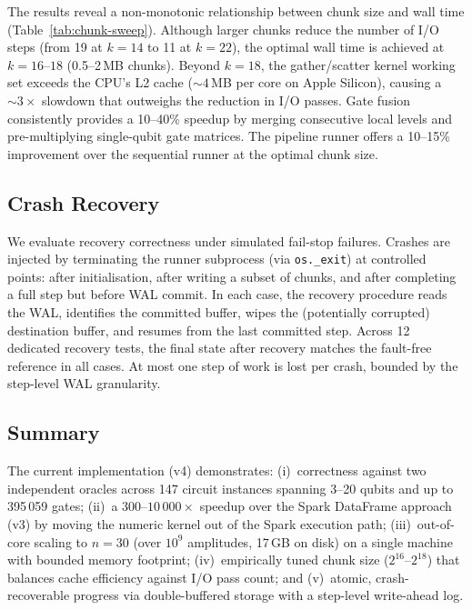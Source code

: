 The results reveal a non-monotonic relationship between chunk size and
wall time (Table~\ref{tab:chunk-sweep}). Although larger chunks reduce
the number of I/O steps (from 19 at $k{=}14$ to 11 at $k{=}22$),
the optimal wall time is achieved at $k = 16$--$18$ (0.5--2\,MB
chunks). Beyond $k = 18$, the gather/scatter kernel working set
exceeds the CPU's L2 cache (${\sim}4$\,MB per core on Apple Silicon),
causing a ${\sim}3\times$ slowdown that outweighs the reduction in
I/O passes. Gate fusion consistently provides a 10--40\% speedup
by merging consecutive local levels and pre-multiplying single-qubit
gate matrices. The pipeline runner offers a 10--15\% improvement over
the sequential runner at the optimal chunk size.

\subsection{Crash Recovery}
\label{sec:recovery-eval}

We evaluate recovery correctness under simulated fail-stop failures.
Crashes are injected by terminating the runner subprocess
(via \texttt{os.\_exit}) at controlled points: after initialisation,
after writing a subset of chunks, and after completing a full step
but before WAL commit. In each case, the recovery procedure reads
the WAL, identifies the committed buffer, wipes the (potentially
corrupted) destination buffer, and resumes from the last committed
step. Across 12 dedicated recovery tests, the final state after
recovery matches the fault-free reference in all cases. At most
one step of work is lost per crash, bounded by the step-level WAL
granularity.

\subsection{Summary}
\label{sec:results-summary}

The current implementation (v4) demonstrates:
(i)~correctness against two independent oracles across 147 circuit
instances spanning 3--20 qubits and up to 395\,059 gates;
(ii)~a $300$--$10\,000\times$ speedup over the Spark DataFrame
approach (v3) by moving the numeric kernel out of the Spark execution
path;
(iii)~out-of-core scaling to $n = 30$ (over $10^9$ amplitudes, 17\,GB
on disk) on a single machine with bounded memory footprint;
(iv)~empirically tuned chunk size ($2^{16}$--$2^{18}$) that balances
cache efficiency against I/O pass count; and
(v)~atomic, crash-recoverable progress via double-buffered storage
with a step-level write-ahead log.

